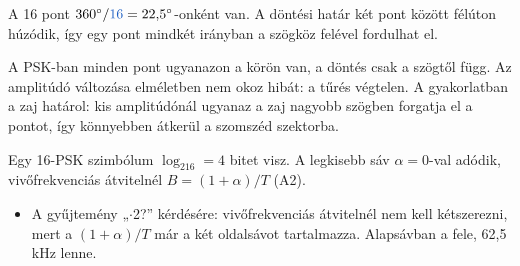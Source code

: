 A 16 pont $360^{\circ}/{\ca{16}}=22{,}5^{\circ}$-onként van. A döntési határ két pont között félúton húzódik, így egy pont mindkét irányban a szögköz felével fordulhat el.

\begin{center}\end{center}

A PSK-ban minden pont ugyanazon a körön van, a döntés csak a szögtől függ. Az amplitúdó változása elméletben nem okoz hibát: a tűrés végtelen. A gyakorlatban a zaj határol: kis amplitúdónál ugyanaz a zaj nagyobb szögben forgatja el a pontot, így könnyebben átkerül a szomszéd szektorba.

Egy 16-PSK szimbólum $\log_216=4$ bitet visz. A legkisebb sáv $\alpha=0$-val adódik, vivőfrekvenciás átvitelnél $B=(1+\alpha)/T$ (A2).

\begin{center}\end{center}

\begin{center}\end{center}
\begin{eredmeny}

\begin{center}\end{center}
\end{eredmeny}
\begin{tipp}[Ellenőrzés]
\begin{itemize}
\item A gyűjtemény „$\cdot$2?” kérdésére: vivőfrekvenciás átvitelnél nem kell kétszerezni, mert a $(1+\alpha)/T$ már a két oldalsávot tartalmazza. Alapsávban a fele, 62,5 kHz lenne.
\end{itemize}
\end{tipp}


